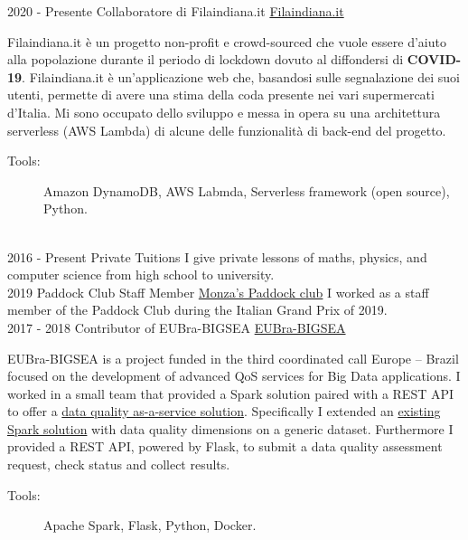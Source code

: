 \documentclass[letterpaper]{twentysecondcvit} %
\begin{document}
\begin{twenty} %
	\twentyitem
	{2020 -}
	{Presente}
	{Collaboratore di Filaindiana.it}
	{\href{https://www.filaindiana.it}{Filaindiana.it}}
	{}
	{
		Filaindiana.it è un progetto non-profit e crowd-sourced che vuole essere d'aiuto alla popolazione durante il periodo di lockdown dovuto al diffondersi di \textbf{COVID-19}. Filaindiana.it è un'applicazione web che, basandosi sulle segnalazione dei suoi utenti, permette di avere una stima della coda presente nei vari supermercati d'Italia. Mi sono occupato dello sviluppo e messa in opera su una architettura serverless (AWS Lambda) di alcune delle funzionalità di back-end del progetto.
		\begin{description}
			\item[Tools:] Amazon DynamoDB, AWS Labmda, Serverless framework (open source), Python.
		\end{description}}
	\\
	\twentyitem
	{2016 -}
	{Present}
	{Private Tuitions}
	{}
	{}
	{I give private lessons of maths, physics, and computer science from high school to university.}
	\\
	\twentyitem
	{2019}
	{}
	{Paddock Club Staff Member}
	{\href{https://tickets.formula1.com/it/h-formula1-hospitality}{Monza's Paddock club}}
	{}
	{I worked as a staff member of the Paddock Club during the Italian Grand Prix of 2019.}
	\\
	\twentyitem
	{2017 -}
	{2018}
	{Contributor of EUBra-BIGSEA}
	{\href{https://www.eubra-bigsea.eu}{EUBra-BIGSEA}}
	{}
	{EUBra-BIGSEA is a project funded in the third coordinated call Europe – Brazil focused on the development of advanced QoS services for Big Data applications. I worked in a small team that provided a Spark solution paired with a REST API to offer a \href{https://www.eubra-bigsea.eu/node/301}{data quality as-a-service solution}. Specifically I extended an \href{https://www.politesi.polimi.it/handle/10589/134468}{existing Spark solution} with data quality dimensions on a generic dataset. Furthermore I provided a REST API, powered by Flask, to submit a data quality assessment request, check status and collect results.
		\begin{description}
			\item[Tools:] Apache Spark, Flask, Python, Docker.
		\end{description}}
\end{twenty}
\end{document}
